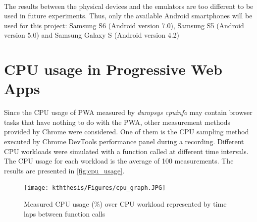 \documentclass{kththesis}
\begin{document}
\begin{table}[!ht]

    \caption{Emulators Tests}
    \label{tab:memulators_test}
\end{table}

\paragraph{}
The results between the physical devices and the emulators are too different to be used in future experiments. Thus, only the available Android smartphones will be used for this project: Samsung S6 (Android version 7.0), Samsung S5 (Android version 5.0) and Samsung Galaxy S (Android version 4.2)


\section{CPU usage in Progressive Web Apps}
\label{results:cpu}
Since the CPU usage of PWA measured by \textit{dumpsys cpuinfo} may contain browser tasks that have nothing to do with the PWA, other measurement methods provided by Chrome were considered. One of them is the CPU sampling method executed by Chrome DevTools performance panel during a recording. 
Different CPU workloads were simulated with a function called at different time intervals. The CPU usage for each workload is the average of 100 measurements. The results are presented in \autoref{fig:cpu_usage}.

\begin{figure}
    \centering
    \texttt{[image: kththesis/Figures/cpu\_graph.JPG]}
    \caption[Measurements of CPU Usage of PWA]{Measured CPU usage (\%) over CPU workload represented by time laps between function calls}
    \label{fig:cpu_usage}
\end{figure}
\end{document}
